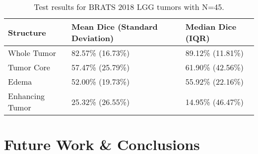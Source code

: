 \documentclass[11pt]{article}
\begin{document}
\begin{table}[H]
\centering
\begin{tabular}{@{}lll@{}}
\toprule
Structure & Mean Dice (Standard Deviation) & Median Dice (IQR) \\ \midrule
Whole Tumor & 82.57\% (16.73\%) & 89.12\% (11.81\%) \\
Tumor Core & 57.47\% (25.79\%) & 61.90\% (42.56\%) \\
Edema & 52.00\% (19.73\%) & 55.92\% (22.16\%) \\
Enhancing Tumor & 25.32\% (26.55\%) & 14.95\% (46.47\%) \\ \bottomrule
\end{tabular}
\caption{Test results for BRATS 2018 LGG tumors with N=45.}
\label{brats-lgg-test}
\end{table}
\section{Future Work \& Conclusions}
\end{document}
